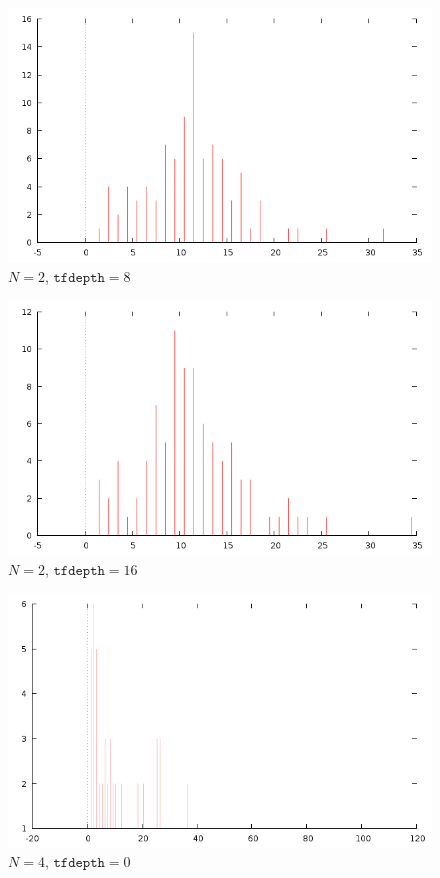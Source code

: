 \documentclass[12pt]{article}
\begin{document}
\begin{figure}[H]
\centering
\caption{$N=2$, $\texttt{tfdepth}=8$}
\includegraphics[scale=0.6]{times2-8.png}
\end{figure} 

\begin{figure}[H]
\centering
\caption{$N=2$, $\texttt{tfdepth}=16$}
\includegraphics[scale=0.6]{times2-16.png}
\end{figure} 

\begin{figure}[H]
\centering
\caption{$N=4$, $\texttt{tfdepth}=0$}
\includegraphics[scale=0.6]{times4-0.png}
\end{figure} 
\end{document}

